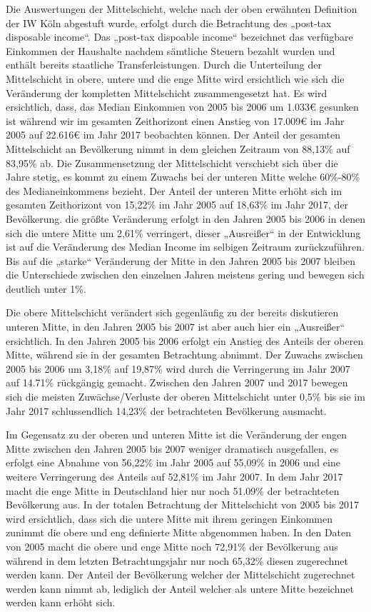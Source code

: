 \documentclass[12pt,]{article}
\newcommand{\euro}{€}
\begin{document}
Die Auswertungen der Mittelschicht, welche nach der oben erwähnten
Definition der IW Köln abgestuft wurde, erfolgt durch die Betrachtung
des „post-tax disposable income``. Das „post-tax dispoable income``
bezeichnet das verfügbare Einkommen der Haushalte nachdem sämtliche
Steuern bezahlt wurden und enthält bereits staatliche
Transferleistungen. Durch die Unterteilung der Mittelschicht in obere,
untere und die enge Mitte wird ersichtlich wie sich die Veränderung der
kompletten Mittelschicht zusammengesetzt hat. Es wird ersichtlich, dass,
das Median Einkommen von 2005 bis 2006 um 1.033\euro{} gesunken ist
während wir im gesamten Zeithorizont einen Anstieg von 17.009\euro{} im
Jahr 2005 auf 22.616\euro{} im Jahr 2017 beobachten können. Der Anteil
der gesamten Mittelschicht an Bevölkerung nimmt in dem gleichen Zeitraum
von 88,13\% auf 83,95\% ab. Die Zusammensetzung der Mittelschicht
verschiebt sich über die Jahre stetig, es kommt zu einem Zuwachs bei der
unteren Mitte welche 60\%-80\% des Medianeinkommens bezieht. Der Anteil
der unteren Mitte erhöht sich im gesamten Zeithorizont von 15,22\% im
Jahr 2005 auf 18,63\% im Jahr 2017, der Bevölkerung. die größte
Veränderung erfolgt in den Jahren 2005 bis 2006 in denen sich die untere
Mitte um 2,61\% verringert, dieser „Ausreißer`` in der Entwicklung ist
auf die Veränderung des Median Income im selbigen Zeitraum
zurückzuführen. Bis auf die „starke`` Veränderung der Mitte in den
Jahren 2005 bis 2007 bleiben die Unterschiede zwischen den einzelnen
Jahren meistens gering und bewegen sich deutlich unter 1\%.

Die obere Mittelschicht verändert sich gegenläufig zu der bereits
diskutieren unteren Mitte, in den Jahren 2005 bis 2007 ist aber auch
hier ein „Ausreißer`` ersichtlich. In den Jahren 2005 bis 2006 erfolgt
ein Anstieg des Anteils der oberen Mitte, während sie in der gesamten
Betrachtung abnimmt. Der Zuwachs zwischen 2005 bis 2006 um 3,18\% auf
19,87\% wird durch die Verringerung im Jahr 2007 auf 14.71\% rückgängig
gemacht. Zwischen den Jahren 2007 und 2017 bewegen sich die meisten
Zuwächse/Verluste der oberen Mittelschicht unter 0,5\% bis sie im Jahr
2017 schlussendlich 14,23\% der betrachteten Bevölkerung ausmacht.

Im Gegensatz zu der oberen und unteren Mitte ist die Veränderung der
engen Mitte zwischen den Jahren 2005 bis 2007 weniger dramatisch
ausgefallen, es erfolgt eine Abnahme von 56,22\% im Jahr 2005 auf
55,09\% in 2006 und eine weitere Verringerung des Anteils auf 52,81\% im
Jahr 2007. In dem Jahr 2017 macht die enge Mitte in Deutschland hier nur
noch 51.09\% der betrachteten Bevölkerung aus. In der totalen
Betrachtung der Mittelschicht von 2005 bis 2017 wird ersichtlich, dass
sich die untere Mitte mit ihrem geringen Einkommen zunimmt die obere und
eng definierte Mitte abgenommen haben. In den Daten von 2005 macht die
obere und enge Mitte noch 72,91\% der Bevölkerung aus während in dem
letzten Betrachtungsjahr nur noch 65,32\% diesen zugerechnet werden
kann. Der Anteil der Bevölkerung welcher der Mittelschicht zugerechnet
werden kann nimmt ab, lediglich der Anteil welcher als untere Mitte
bezeichnet werden kann erhöht sich.
\end{document}
